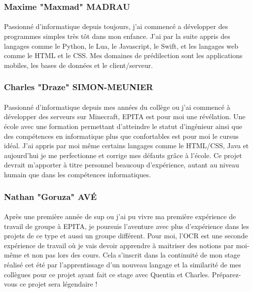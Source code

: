 \documentclass{article}
\begin{document}
\subsubsection{Maxime "Maxmad" MADRAU}
\paragraph{}Passionné d'informatique depuis toujours, j'ai commencé a développer des programmes simples très tôt dans mon enfance. J'ai par la suite appris des langages comme le Python, le Lua, le Javascript, le Swift, et les langages web comme le HTML et le CSS. Mes domaines de prédilection sont les applications mobiles, les bases de données et le client/serveur.

\subsubsection{Charles "Draze" SIMON-MEUNIER}
\paragraph{}Passionné d'informatique depuis mes années du collège ou j'ai commencé à développer des serveurs sur Minecraft, EPITA est pour moi une révélation. Une école avec une formation permettant d'atteindre le statut d'ingénieur ainsi que des compétences en informatique plus que confortables est pour moi le cursus idéal. J'ai appris par moi même certains langages comme le HTML/CSS, Java et aujourd'hui je me perfectionne et corrige mes défauts grâce à l'école. Ce projet devrait m'apporter à titre personnel beaucoup d'expérience, autant au niveau humain que dans les compétences informatiques.

\subsubsection{Nathan "Goruza" AVÉ}
\paragraph{}Après une première année de sup ou j’ai pu vivre ma première expérience de travail de groupe à EPITA, je poursuis l’aventure avec plus d’expérience dans les projets de ce type et aussi un groupe différent. Pour moi, l'OCR est une seconde expérience de travail où je vais devoir apprendre à maitriser des notions par moi-même et non pas lors des cours. Cela s’inscrit dans la continuité de mon stage réalisé cet été par l’apprentissage d’un nouveau langage et la similarité de mes collègues pour ce projet ayant fait ce stage avec Quentin et Charles. Préparez-vous ce projet sera légendaire !
\end{document}
